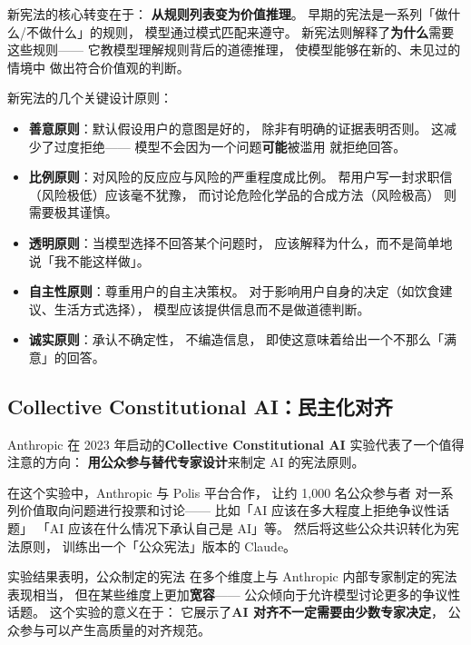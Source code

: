 
新宪法的核心转变在于：
\textbf{从规则列表变为价值推理}。
早期的宪法是一系列「做什么/不做什么」的规则，
模型通过模式匹配来遵守。
新宪法则解释了\textbf{为什么}需要这些规则——
它教模型理解规则背后的道德推理，
使模型能够在新的、未见过的情境中
做出符合价值观的判断。

新宪法的几个关键设计原则：
\begin{itemize}[noitemsep]
  \item \textbf{善意原则}：默认假设用户的意图是好的，
        除非有明确的证据表明否则。
        这减少了过度拒绝——
        模型不会因为一个问题\textbf{可能}被滥用
        就拒绝回答。
  \item \textbf{比例原则}：对风险的反应应与风险的严重程度成比例。
        帮用户写一封求职信（风险极低）应该毫不犹豫，
        而讨论危险化学品的合成方法（风险极高）
        则需要极其谨慎。
  \item \textbf{透明原则}：当模型选择不回答某个问题时，
        应该解释为什么，而不是简单地说「我不能这样做」。
  \item \textbf{自主性原则}：尊重用户的自主决策权。
        对于影响用户自身的决定（如饮食建议、生活方式选择），
        模型应该提供信息而不是做道德判断。
  \item \textbf{诚实原则}：承认不确定性，
        不编造信息，
        即使这意味着给出一个不那么「满意」的回答。
\end{itemize}

\subsection{Collective Constitutional AI：民主化对齐}


Anthropic 在 2023 年启动的\textbf{Collective Constitutional AI}
实验代表了一个值得注意的方向：
\textbf{用公众参与替代专家设计}来制定 AI 的宪法原则。

在这个实验中，Anthropic 与 Polis 平台合作，
让约 1,000 名公众参与者
对一系列价值取向问题进行投票和讨论——
比如「AI 应该在多大程度上拒绝争议性话题」
「AI 应该在什么情况下承认自己是 AI」等。
然后将这些公众共识转化为宪法原则，
训练出一个「公众宪法」版本的 Claude。

实验结果表明，公众制定的宪法
在多个维度上与 Anthropic 内部专家制定的宪法表现相当，
但在某些维度上更加\textbf{宽容}——
公众倾向于允许模型讨论更多的争议性话题。
这个实验的意义在于：
它展示了\textbf{AI 对齐不一定需要由少数专家决定}，
公众参与可以产生高质量的对齐规范。


